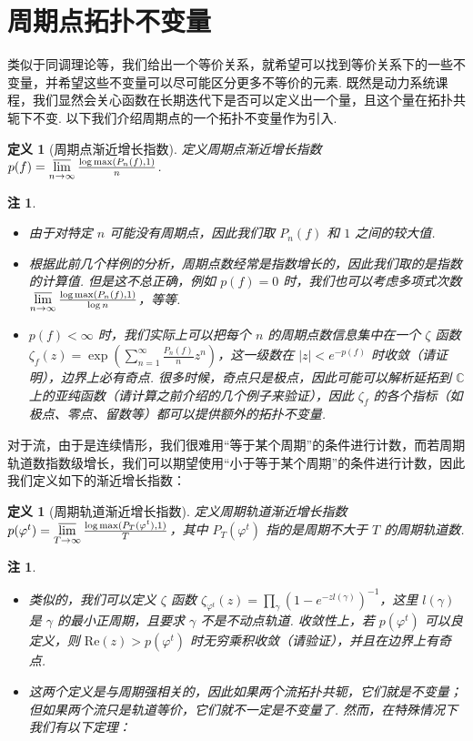 \documentclass[11pt, a4paper, oneside]{ctexart}
\newtheorem{definition}[theorem]{定义}
\newtheorem{remark}[theorem]{注}
\newcommand{\C}{\mathbb{C}}
\newcommand{\re}{\mathrm{Re}}
\newcommand{\abs}[1]{\left|{#1}\right|}
\begin{document}
    \section{周期点拓扑不变量}
    类似于同调理论等，我们给出一个等价关系，就希望可以找到等价关系下的一些不变量，并希望这些不变量可以尽可能区分更多不等价的元素. 既然是动力系统课程，我们显然会关心函数在长期迭代下是否可以定义出一个量，且这个量在拓扑共轭下不变. 以下我们介绍周期点的一个拓扑不变量作为引入.
    \begin{definition}[周期点渐近增长指数]
        定义周期点渐近增长指数 $p(f)=\varlimsup\limits_{n\to\infty}\frac{\log\max(P_n(f),1)}{n}$.
    \end{definition}
    \begin{remark}
        \begin{itemize}
            \item 由于对特定 $n$ 可能没有周期点，因此我们取 $P_n(f)$ 和 $1$ 之间的较大值.
            \item 根据此前几个样例的分析，周期点数经常是指数增长的，因此我们取的是指数的计算值. 但是这不总正确，例如 $p(f)=0$ 时，我们也可以考虑多项式次数 $\varlimsup\limits_{n\to\infty}\frac{\log\max(P_n(f),1)}{\log n}$，等等.
            \item $p(f)<\infty$ 时，我们实际上可以把每个 $n$ 的周期点数信息集中在一个 $\zeta$ 函数 $\zeta_f(z)=\exp(\sum\limits_{n=1}^{\infty}\frac{P_n(f)}{n}z^n)$，这一级数在 $\abs{z}<e^{-p(f)}$ 时收敛（请证明），边界上必有奇点. 很多时候，奇点只是极点，因此可能可以解析延拓到 $\C$ 上的亚纯函数（请计算之前介绍的几个例子来验证），因此 $\zeta_f$ 的各个指标（如极点、零点、留数等）都可以提供额外的拓扑不变量.
        \end{itemize}
    \end{remark}

    对于流，由于是连续情形，我们很难用“等于某个周期”的条件进行计数，而若周期轨道数指数级增长，我们可以期望使用“小于等于某个周期”的条件进行计数，因此我们定义如下的渐近增长指数：
    \begin{definition}[周期轨道渐近增长指数]
        定义周期轨道渐近增长指数 $p(\varphi^t)=\varlimsup\limits_{T\to\infty}\frac{\log\max(P_T(\varphi^t),1)}{T}$，其中 $P_T(\varphi^t)$ 指的是周期不大于 $T$ 的周期轨道数.
    \end{definition}
    \begin{remark}
        \begin{itemize}
            \item 类似的，我们可以定义 $\zeta$ 函数 $\zeta_{\varphi^t}(z)=\prod\limits_{\gamma}{(1-e^{-zl(\gamma)})}^{-1}$，这里 $l(\gamma)$ 是 $\gamma$ 的最小正周期，且要求 $\gamma$ 不是不动点轨道. 收敛性上，若 $p(\varphi^t)$ 可以良定义，则 $\re(z)>p(\varphi^t)$ 时无穷乘积收敛（请验证），并且在边界上有奇点.
            \item 这两个定义是与周期强相关的，因此如果两个流拓扑共轭，它们就是不变量；但如果两个流只是轨道等价，它们就不一定是不变量了. 然而，在特殊情况下我们有以下定理：
        \end{itemize}
    \end{remark}
\end{document}
